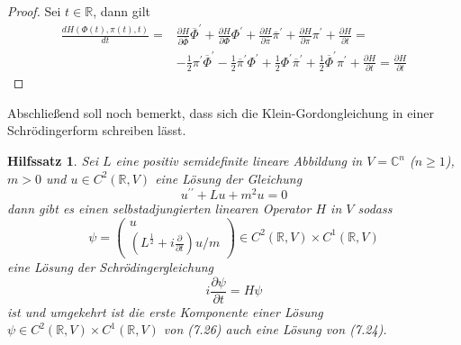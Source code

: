 \documentclass[11pt,a4paper,leqno]{report}
\newtheorem{lemma}[theorem]{Hilfssatz}
\numberwithin{equation}{chapter}
\begin{document}
\begin{proof}
	Sei $t\in\mathbb{R}$, dann gilt
	\begin{align*}
\frac{dH(\Phi(t), \pi(t),t)}{dt}=&\frac{\partial H}{\partial \overline{\Phi}}\overline{\Phi}^\prime + \frac{\partial H}{\partial \Phi}\Phi^\prime +\frac{\partial H}{\partial \overline{\pi}}\overline{\pi}^\prime + \frac{\partial H}{\partial \pi}\pi^\prime + \frac{\partial H}{\partial t}=\\
&-\frac{1}{2}\pi^\prime\overline{\Phi}^\prime  -\frac{1}{2}\overline{\pi}^\prime\Phi^\prime +\frac{1}{2}\Phi^\prime\overline{\pi}^\prime + \frac{1}{2}\overline{\Phi}^\prime\pi^\prime + \frac{\partial H}{\partial t}=\frac{\partial H}{\partial t}
	\end{align*}
\end{proof}
\noindent
Abschlie\ss{}end soll noch bemerkt, dass sich die Klein-Gordongleichung in einer Schr\"odingerform schreiben l\"asst. 
\begin{lemma}
	Sei $L$ eine positiv semidefinite lineare Abbildung in $V=\mathbb{C}^n$ ($n\geq 1 $), $m>0$ und $u\in C^2(\mathbb{R}, V)$ eine L\"osung der Gleichung
\begin{equation}
	u^{\prime \prime} + Lu + m^2u= 0
\end{equation}
dann gibt es einen selbstadjungierten linearen Operator $H$ in $V$ sodass 
\begin{equation}
	\psi = \begin{pmatrix}
		u \\ (L^\frac{1}{2} + i \frac{\partial}{\partial t})u/m
	\end{pmatrix}\in C^2(\mathbb{R},V)\times C^1(\mathbb{R},V)
\end{equation}
eine L\"osung der Schrödingergleichung
\begin{equation}
	i\frac{\partial\psi}{\partial t} = H\psi
\end{equation}
ist und umgekehrt ist die erste Komponente einer L\"osung $\psi\in C^2(\mathbb{R},V)\times C^1(\mathbb{R},V)$ von (7.26) auch eine L\"osung von (7.24).
\end{lemma}
\end{document}
